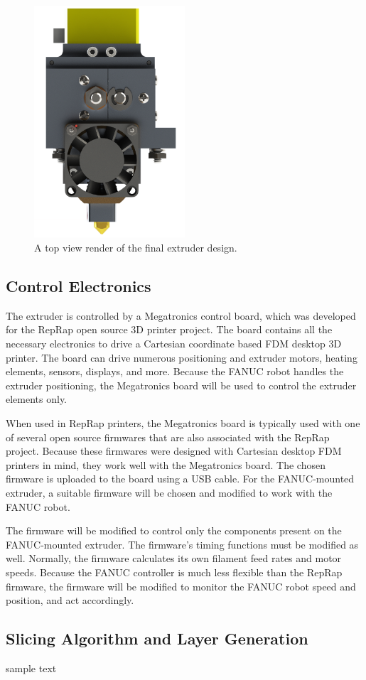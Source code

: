 \begin{figure}[htp]
\centering
\includegraphics[width=0.5\textwidth]{./figures/extruder-front}
\caption{A top view render of the final extruder design.}
\label{fig:flowchart}
\end{figure}

\clearpage

\subsection{Control Electronics}
\indent 

The extruder is controlled by a Megatronics control board, which was developed for the RepRap open source 3D printer project. The board contains all the necessary electronics to drive a Cartesian coordinate based FDM desktop 3D printer. The board can drive numerous positioning and extruder motors, heating elements, sensors, displays, and more. Because the FANUC robot handles the extruder positioning, the Megatronics board will be used to control the extruder elements only. 

When used in RepRap printers, the Megatronics board is typically used with one of several open source firmwares that are also associated with the RepRap project. Because these firmwares were designed with Cartesian desktop FDM printers in mind, they work well with the Megatronics board. The chosen firmware is uploaded to the board using a USB cable. For the FANUC-mounted extruder, a suitable firmware will be chosen and modified to work with the FANUC robot.

The firmware will be modified to control only the components present on the FANUC-mounted extruder. The firmware's timing functions must be modified as well. Normally, the firmware calculates its own filament feed rates and motor speeds. Because the FANUC controller is much less flexible than the RepRap firmware, the firmware will be modified to monitor the FANUC robot speed and position, and act accordingly. 

\subsection{Slicing Algorithm and Layer Generation}

\indent



sample text
